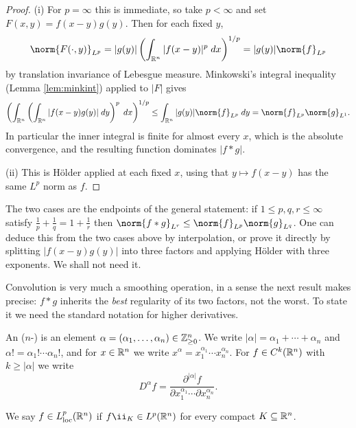 \documentclass[a4paper]{scrartcl}
\begin{document}
\begin{proof}
	(i) For $p = \infty$ this is immediate, so take $p < \infty$ and set $F(x,y) = f(x-y)g(y)$. Then for each fixed $y$,
	$$\norm{F(\cdot,y)}_{L^p}=|g(y)| \left( \int_{\R^n}|f(x-y)|^p\dd x\right)^{1/p}=|g(y)|\norm{f}_{L^p}$$
	by translation invariance of Lebesgue measure. Minkowski's integral inequality (Lemma \ref{lem:minkint}) applied to $|F|$ gives
	$$\left( \int_{\R^n}\left( \int_{\R^n}|f(x-y)g(y)|\dd y\right)^p\dd x\right)^{1/p}\le\int_{\R^n}|g(y)|\norm{f}_{L^p}\dd y = \norm{f}_{L^p}\norm{g}_{L^1}.$$
	In particular the inner integral is finite for almost every $x$, which is the absolute convergence, and the resulting function dominates $|f*g|$.

	(ii) This is H\"older applied at each fixed $x$, using that $y \mapsto f(x-y)$ has the same $L^p$ norm as $f$.
\end{proof}

\begin{remark}
	The two cases are the endpoints of the general statement: if $1 \le p,q,r\le\infty$ satisfy $\frac1p+\frac1q=1+\frac1r$ then $\norm{f*g}_{L^r}\le\norm{f}_{L^p}\norm{g}_{L^q}$. One can deduce this from the two cases above by interpolation, or prove it directly by splitting $|f(x-y)g(y)|$ into three factors and applying H\"older with three exponents. We shall not need it.
\end{remark}

Convolution is very much a smoothing operation, in a sense the next result makes precise: $f * g$ inherits the \emph{best} regularity of its two factors, not the worst. To state it we need the standard notation for higher derivatives.

\begin{definition}
	An ($n$-) is an element $\alpha = (\alpha_1, \dots, \alpha_n) \in \mathbb{Z}_{\ge 0}^n$. We write $|\alpha| = \alpha_1 + \cdots + \alpha_n$ and $\alpha! = \alpha_1! \cdots \alpha_n!$, and for $x \in \mathbb{R}^n$ we write $x^\alpha = x_1^{\alpha_1} \cdots x_n^{\alpha_n}$. For $f \in C^k(\mathbb{R}^n)$ with $k \ge |\alpha|$ we write
	$$D^\alpha f = \frac{\partial^{|\alpha|} f}{\partial x_1^{\alpha_1} \cdots \partial x_n^{\alpha_n}}.$$
\end{definition}

\begin{definition}
	We say $f \in L^p_{\mathrm{loc}}(\mathbb{R}^n)$ if $f \ii_K \in L^p(\R^n)$ for every compact $K \subseteq \mathbb{R}^n$.
\end{definition}
\end{document}
